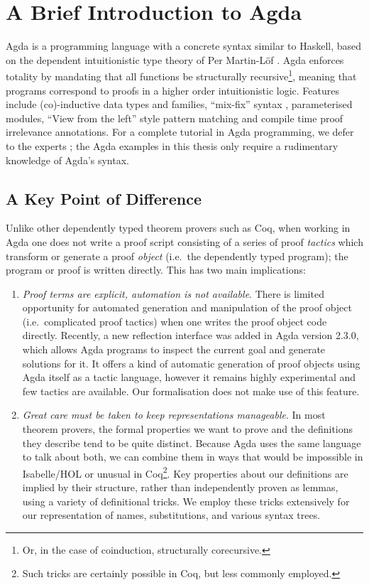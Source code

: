 \documentclass[a4paper]{jfp}
\begin{document}
\section{A Brief Introduction to Agda}
 
Agda is a programming language with a concrete syntax similar to Haskell, based on the dependent intuitionistic type theory of Per Martin-L\"of \cite{MartinLof:1984tr}. Agda enforces totality by mandating that all functions be structurally recursive\footnote{Or, in the case of coinduction, structurally corecursive.}, meaning that programs correspond to proofs in a higher order intuitionistic logic. Features include (co)-inductive data types and families, ``mix-fix'' syntax \cite{springerlink:10.1007/978-3-642-24452-0_5}, parameterised modules, ``View from the left'' style pattern matching \cite{McBride:2004:VL:967492.967496} and compile time proof irrelevance annotations. For a complete tutorial in Agda programming, we defer to the experts \cite{conf/afp/norell08}; the Agda examples in this thesis only require a rudimentary knowledge of Agda's syntax.

\subsection{A Key Point of Difference}

Unlike other dependently typed theorem provers such as Coq, when working in Agda one does not write a proof script consisting of a series of proof \emph{tactics} which transform or generate a proof \emph{object} (i.e.\ the dependently typed program); the program or proof is written directly. This has two main implications:
\begin{enumerate}
	\item \emph{Proof terms are explicit, automation is not available}. There is limited opportunity for automated generation and manipulation of the proof object (i.e.\ complicated proof tactics) when one writes the proof object code directly. Recently, a new reflection interface was added in Agda version 2.3.0, which allows Agda programs to inspect the current goal and generate solutions for it. It offers a kind of automatic generation of proof objects using Agda itself as a tactic language, however it remains highly experimental and few tactics are available. Our formalisation does not make use of this feature.
	\item \emph{Great care must be taken to keep representations manageable}. In most theorem provers, the formal properties we want to prove and the definitions they describe tend to be quite distinct. Because Agda uses the same language to talk about both, we can combine them in ways that would be impossible in Isabelle/HOL or unusual in Coq\footnote{Such tricks are certainly possible in Coq, but less commonly employed.}. Key properties about our definitions are implied by their structure, rather than independently proven as lemmas, using a variety of definitional tricks. We employ these tricks extensively for our representation of names, substitutions, and various syntax trees. 
\end{enumerate}
\end{document}

